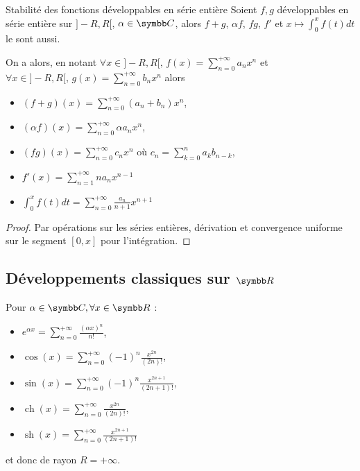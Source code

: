 \begin{proposition}{Stabilité des fonctions développables en série entière}{}
    Soient $f, g$ développables en série entière sur $]-R, R[$, $\alpha \in \C$, alors 
    $f + g$, $\alpha f$, $fg$, $f'$ et $x \mapsto \int_0^x f(t) dt$ le sont aussi. 

\end{proposition}

On a alors, en notant $\displaystyle \forall x \in ]-R, R[, \, f(x) = \sum_{n = 0}^{+\infty} a_n x^n$ et
    $\displaystyle \forall x \in ]-R, R[, \, g(x) = \sum_{n = 0}^{+\infty} b_n x^n$ alors 
    
    \begin{itemize}
        \item $\displaystyle (f + g)(x) = \sum_{n = 0}^{+\infty} (a_n + b_n) x^n$, 
        \item $\displaystyle (\alpha f)(x) = \sum_{n = 0}^{+\infty} \alpha a_n x^n$,
        \item $\displaystyle (fg)(x) = \sum_{n = 0}^{+\infty} c_n x^n$ où $\displaystyle c_n = \sum_{k = 0}^n a_k b_{n - k}$,
        \item $\displaystyle f'(x) = \sum_{n = 1}^{+\infty} n a_n x^{n - 1}$
        \item $\displaystyle \int_0^x f(t) dt = \sum_{n = 0}^{+\infty} \frac{a_n}{n + 1} x^{n + 1}$
    \end{itemize}

\begin{proof}
    Par opérations sur les séries entières, dérivation et convergence uniforme sur le segment 
    $[0, x]$ pour l'intégration.
\end{proof}

\subsection{Développements classiques sur \texorpdfstring{$\R$}{R} }

\begin{proposition}{}{}
    Pour $\alpha \in \C, \forall x \in \R$ : 
    \begin{itemize}
        \item $\displaystyle e^{\alpha x} = \sum_{n = 0}^{+\infty} \frac{(\alpha x)^n}{n!}$,
        \item $\displaystyle \cos(x) = \sum_{n = 0}^{+\infty} (-1)^n \frac{x^{2n}}{(2n)!}$,
        \item $\displaystyle \sin(x) = \sum_{n = 0}^{+\infty} (-1)^n \frac{x^{2n + 1}}{(2n + 1)!}$,
        \item $\displaystyle \operatorname{ch } (x) = \sum_{n = 0}^{+\infty} \frac{x^{2n}}{(2n)!}$,
        \item $\displaystyle \operatorname{sh } (x) = \sum_{n = 0}^{+\infty} \frac{x^{2n + 1}}{(2n + 1)!}$
    \end{itemize}
    et donc de rayon $R = + \infty$.
\end{proposition}


